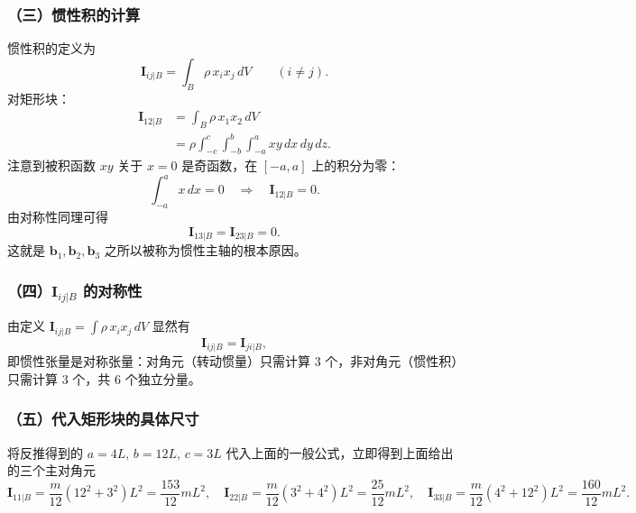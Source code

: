 \subsubsection{（三）惯性积的计算}
惯性积的定义为
\begin{equation}
    \mathbf{I}_{ij|B}=\int_{B}\rho\,x_{i}x_{j}\,dV \qquad (i\neq j).
\end{equation}
对矩形块：
\begin{equation}
\begin{aligned}
\mathbf{I}_{12|B}
  &= \int_{B}\rho\,x_{1}x_{2}\,dV \\
  &= \rho\int_{-c}^{c}\!\!\int_{-b}^{b}\!\!\int_{-a}^{a}xy\,dx\,dy\,dz.
\end{aligned}
\end{equation}
注意到被积函数 $xy$ 关于 $x=0$ 是奇函数，在 $[-a,a]$ 上的积分为零：
\begin{equation}
    \int_{-a}^{a}x\,dx = 0 \quad\Longrightarrow\quad \mathbf{I}_{12|B}=0.
\end{equation}
由对称性同理可得
\begin{equation}
    \mathbf{I}_{13|B}=\mathbf{I}_{23|B}=0.
\end{equation}
这就是 $\boldsymbol{b}_{1},\boldsymbol{b}_{2},\boldsymbol{b}_{3}$ 之所以被称为惯性主轴的根本原因。

\subsubsection{（四）$\mathbf{I}_{ij|B}$ 的对称性}
由定义 $\mathbf{I}_{ij|B}=\int\rho\,x_{i}x_{j}\,dV$ 显然有
\begin{equation}
    \mathbf{I}_{ij|B}=\mathbf{I}_{ji|B},
\end{equation}
即惯性张量是对称张量：对角元（转动惯量）只需计算 3 个，非对角元（惯性积）只需计算 3 个，共 6 个独立分量。

\subsubsection{（五）代入矩形块的具体尺寸}
将反推得到的 $a=4L,\,b=12L,\,c=3L$ 代入上面的一般公式，立即得到上面给出的三个主对角元
\[
\mathbf{I}_{11|B}=\frac{m}{12}(12^{2}+3^{2})L^{2}=\frac{153}{12}mL^{2},\quad
\mathbf{I}_{22|B}=\frac{m}{12}(3^{2}+4^{2})L^{2}=\frac{25}{12}mL^{2},\quad
\mathbf{I}_{33|B}=\frac{m}{12}(4^{2}+12^{2})L^{2}=\frac{160}{12}mL^{2}.
\]
